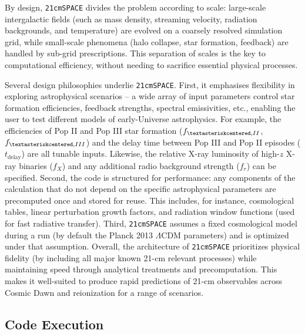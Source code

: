\documentclass[floats,floatfix,showpacs,amssymb,prd,superscriptaddress,nofootinbib]{revtex4-2} %
\newcommand{\code}{\texttt}
\newcommand{\red}{\textcolor{red}}
\begin{document}
By design, \code{21cmSPACE} divides the problem according to scale: large-scale intergalactic fields (such as mass density, streaming velocity, radiation backgrounds, and temperature) are evolved on a coarsely resolved simulation grid, while small-scale phenomena (halo collapse, star formation, feedback) are handled by sub-grid prescriptions. 
This separation of scales is the key to computational efficiency, without needing to sacrifice essential physical processes.

Several design philosophies underlie \code{21cmSPACE}. First, it emphasises flexibility in exploring astrophysical scenarios -- a wide array of input parameters
control star formation efficiencies, feedback strengths, spectral emissivities, etc., enabling the user to test different models of early-Universe astrophysics. For example, the efficiencies of Pop II  and Pop III star formation ($f_{\textasteriskcentered,II}$, $f_{\textasteriskcentered,III}$) and the delay time between Pop III and Pop II episodes ($t_{\text{delay}}$) are all tunable inputs. Likewise, the relative X-ray luminosity of high-$z$ X-ray binaries ($f_X$) and any additional radio background strength ($f_r$) can be specified. Second, the code is structured for performance: any components of the calculation that do not depend on the specific astrophysical parameters are precomputed once and stored for reuse. This includes, for instance, cosmological tables, linear perturbation growth factors, and radiation window functions (used for fast radiative transfer). Third, \code{21cmSPACE} assumes a fixed cosmological model during a run (by default the Planck 2013 $\Lambda$CDM parameters) and is optimized under that assumption. 
Overall, the architecture of \code{21cmSPACE} prioritizes physical fidelity (by including all major known 21-cm relevant processes) while maintaining speed through analytical treatments and precomputation. This makes it well-suited to produce rapid predictions of 21-cm observables across Cosmic Dawn and reionization for a range of scenarios.


\subsection{Code Execution}
\end{document}
